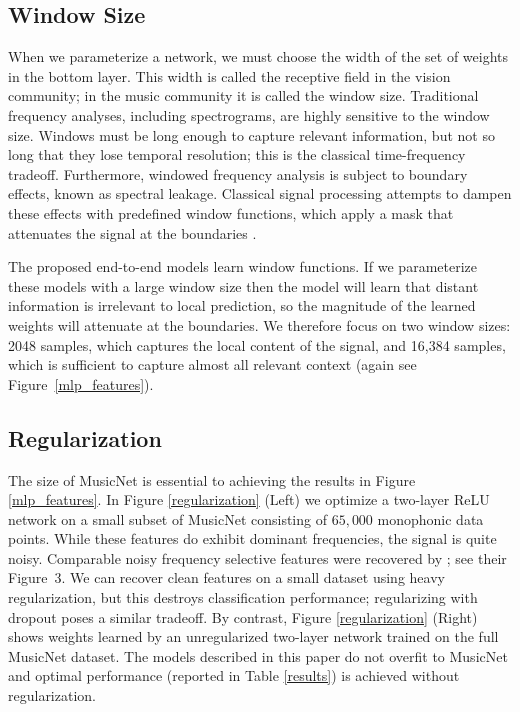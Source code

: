 \documentclass{article} \usepackage{iclr2017_conference,times}
\begin{document}
\subsection{Window Size}\label{window_section}

When we parameterize a network, we must choose the width of the set of weights in the bottom layer. This width is called the receptive field in the vision community; in the music community it is called the window size. Traditional frequency analyses, including spectrograms, are highly sensitive to the window size. Windows must be long enough to capture relevant information, but not so long that they lose temporal resolution; this is the classical time-frequency tradeoff. Furthermore, windowed frequency analysis is subject to boundary effects, known as spectral leakage. Classical signal processing attempts to dampen these effects with predefined window functions, which apply a mask that attenuates the signal at the boundaries \citep{rabiner}. 

The proposed end-to-end models learn window functions. If we parameterize these models with a large window size then the model will learn that distant information is irrelevant to local prediction, so the magnitude of the learned weights will attenuate at the boundaries. We therefore focus on two window sizes: 2048 samples, which captures the local content of the signal, and 16,384 samples, which is sufficient to capture almost all relevant context (again see Figure~\ref{mlp_features}).

\subsection{Regularization}\label{reg_section}

The size of MusicNet is essential to achieving the results in Figure \ref{mlp_features}. In Figure \ref{regularization} (Left) we optimize a two-layer ReLU network on a small subset of MusicNet consisting of $65,000$ monophonic data points. While these features do exhibit dominant frequencies, the signal is quite noisy. Comparable noisy frequency selective features were recovered by \cite{dieleman}; see their Figure~3. We can recover clean features on a small dataset using heavy regularization, but this destroys classification performance; regularizing with dropout poses a similar tradeoff. By contrast, Figure \ref{regularization} (Right) shows weights learned by an unregularized two-layer network trained on the full MusicNet dataset. The models described in this paper do not overfit to MusicNet and optimal performance (reported in Table \ref{results}) is achieved without regularization.
\end{document}
